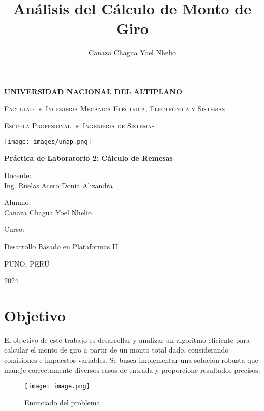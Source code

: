 \documentclass[11pt,a4paper]{article}
\title{Análisis del Cálculo de Monto de Giro}
\author{Canaza Chagua Yoel Nhelio}
\date{}
\begin{document}
\begin{titlepage}
\centering


{\bfseries\LARGE UNIVERSIDAD NACIONAL DEL ALTIPLANO\par}
{\scshape\LARGE Facultad de Ingeniería Mecánica Eléctrica, Electrónica y Sistemas\par}
{\scshape\LARGE Escuela Profesional de Ingeniería de Sistemas\par}
\vspace{0.8cm}
{\texttt{[image: images/unap.png]}\par}
\vspace{0.4cm}
{\bfseries\LARGE Práctica de Laboratorio 2: Cálculo de Remesas
\par}
\vspace{0.8cm}
{\LARGE Docente:\\ Ing. Ruelas Acero Donia Alizandra   \\  \par}
\vspace{0.8cm}

{\LARGE Alumno: \\
Canaza Chagua Yoel Nhelio \\
\par}
\vspace{0.8cm}
{\LARGE Curso: \par}
{\LARGE Desarrollo Basado en Plataformas II\par}
\vspace{0.8cm}

{\LARGE PUNO, PERÚ \par}
{\LARGE 2024 \par}


\end{titlepage}

\section{Objetivo}
El objetivo de este trabajo es desarrollar y analizar un algoritmo eficiente para calcular el monto de giro a partir de un monto total dado, considerando comisiones e impuestos variables. Se busca implementar una solución robusta que maneje correctamente diversos casos de entrada y proporcione resultados precisos.

\begin{figure}[H]
    \centering
    \texttt{[image: image.png]}
    \caption{Enunciado del problema}
    \label{fig:enter-label}
\end{figure}
\end{document}

